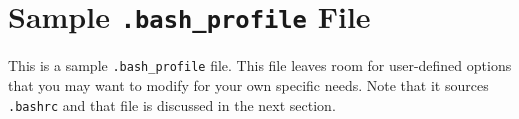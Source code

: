 \documentclass[11pt]{nmemo}
\newcommand{\comp}[1]{\normalfont\footnotesize\texttt{#1}\normalsize}
\newcommand{\capsaicin}{{\normalfont\sffamily Capsaicin}}
\begin{document}








\pagebreak
\appendix

\section{Sample \comp{.bash\_profile} File}
\label{.bashprofile}

This is a sample \comp{.bash\_profile} file. This file leaves room for
user-defined options that you may want to modify for your own specific
needs.  Note that it sources \comp{.bashrc} and that file is discussed
in the next section.
\end{document}
